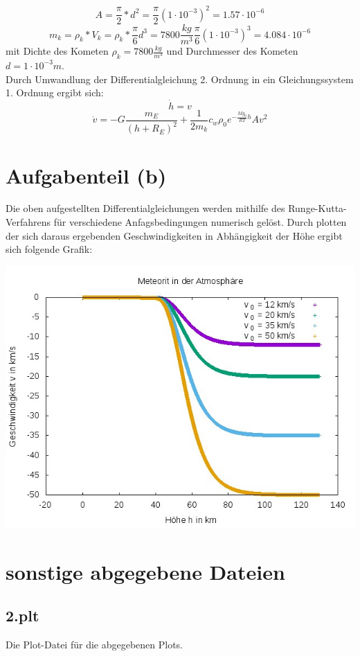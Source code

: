 \documentclass{scrreprt}
\begin{document}
\[A = \frac{\pi}{2}*d^2 = \frac{\pi}{2}(1\cdot 10^{-3})^2 = 1.57 \cdot 10^{-6}\]
\[m_k = \rho_k*V_k = \rho_k * \frac{\pi}{6} d^3 = 7800 \frac{kg}{m^3} \frac{\pi}{6}(1 \cdot 10^{-3})^3 = 4.084 \cdot 10^{-6} \]
mit Dichte des Kometen $\rho_k = 7800 \frac{kg}{m^3}$ und Durchmesser des Kometen $d = 1 \cdot 10^{-3}m$.\\
Durch Umwandlung der Differentialgleichung 2. Ordnung in ein Gleichungssystem 1. Ordnung ergibt sich:
\[\dot{h} = v\]
\[\dot{v} = -G \frac{m_E}{(h+R_E)^2} + \frac{1}{2 m_k}c_w \rho_0 e^{- \frac{M g_0}{R T}h}A v^2\]

\section*{Aufgabenteil (b)}
Die oben aufgestellten Differentialgleichungen werden mithilfe des Runge-Kutta-Verfahrens für verschiedene Anfagsbedingungen numerisch gelöst.
Durch plotten der sich daraus ergebenden Geschwindigkeiten in Abhängigkeit der Höhe ergibt sich folgende Grafik:

\begin{center}
	\includegraphics[scale=0.7]{2.jpeg}
\end{center}

\section*{sonstige abgegebene Dateien}
\subsection*{2.plt}
Die Plot-Datei für die abgegebenen Plots.
\end{document}
